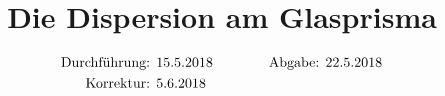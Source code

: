 

\subject{V402}
\title{Die Dispersion am Glasprisma}
\date{
  \begin{align}
    \text{Durchführung: } & \text{15.5.2018} & \hspace{3em} & \text{Abgabe: 22.5.2018} \notag
\\  \text{Korrektur: } & \text{5.6.2018} & \hspace {3em} & \notag
  \end{align}
}


\maketitle
\thispagestyle{empty}
\tableofcontents
\newpage






\printbibliography{}


